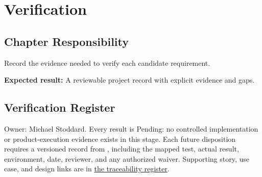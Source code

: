 \chapter{Verification}
\section{Chapter Responsibility}
\label{Section:VerificationResponsibility}
Record the evidence needed to verify each candidate requirement.

\noindent\textbf{Expected result:} A reviewable project record with explicit evidence and gaps.


\section{Verification Register}
Owner: Michael Stoddard. Every result is Pending: no controlled implementation or product-execution evidence exists in this stage. Each future disposition requires a versioned record from , including the mapped test, actual result, environment, date, reviewer, and any authorized waiver. Supporting story, use case, and design links are in \hyperref[Table:TraceabilityMatrix]{the traceability register}.
\small
